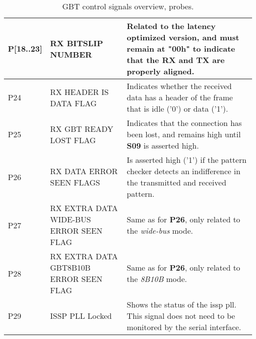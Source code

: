 \documentclass[main.tex]{subfiles}
\begin{document}
\begin{table}[H]
\begin{center}
\begin{tabular}{| l | p{5cm} | p{8cm} |}
  \hline
  P[18..23]   & RX BITSLIP NUMBER         & Related to the latency optimized version, and must remain at "00h" to indicate that the RX and TX are properly aligned. \\
  \hline
  P24       & RX HEADER IS DATA FLAG      & Indicates whether the received data has a header of the frame that is idle ('0') or data ('1'). \\
  \hline
  P25       & RX GBT READY LOST FLAG      & Indicates that the connection has been lost, and remains high until \textbf{S09} is asserted high.\\
  \hline
  P26       & RX DATA ERROR SEEN FLAGS      & Is asserted high ('1') if the pattern checker detects an indifference in the transmitted and received pattern. \\
  \hline
  P27       & RX EXTRA DATA WIDE-BUS ERROR SEEN FLAG      & Same as for \textbf{P26}, only related to the \textit{wide-bus} mode. \\  
  \hline
  P28       & RX EXTRA DATA GBT8B10B ERROR SEEN FLAG      & Same as for \textbf{P26}, only related to the \textit{8B10B} mode. \\
  \hline  
  P29     & ISSP PLL Locked             & Shows the status of the issp pll. This signal does not need to be monitored by the serial interface. \\
  \hline     
  \end{tabular}  
  \caption{GBT control signals overview, probes.}
  \label{tab:probe}
\end{center}
\end{table}
\end{document}

